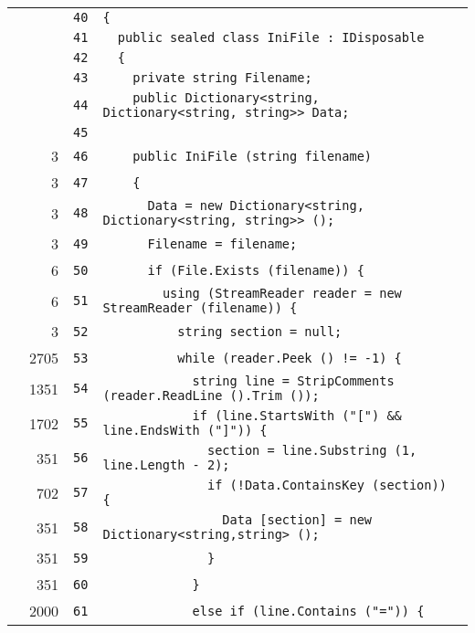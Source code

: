 \documentclass[a4paper,10pt]{article}
\begin{document}
\begin{longtable}[l]{lrrl}
\cellcolor{gray} &  & \verb~40~ & \verb~{~\\
\cellcolor{gray} &  & \verb~41~ & \verb~  public sealed class IniFile : IDisposable~\\
\cellcolor{gray} &  & \verb~42~ & \verb~  {~\\
\cellcolor{gray} &  & \verb~43~ & \verb~    private string Filename;~\\
\cellcolor{gray} &  & \verb~44~ & \verb~    public Dictionary<string, Dictionary<string, string>> Data;~\\
\cellcolor{gray} &  & \verb~45~ & \verb~~\\
\cellcolor{green} & 3 & \verb~46~ & \verb~    public IniFile (string filename)~\\
\cellcolor{green} & 3 & \verb~47~ & \verb~    {~\\
\cellcolor{green} & 3 & \verb~48~ & \verb~      Data = new Dictionary<string, Dictionary<string, string>> ();~\\
\cellcolor{green} & 3 & \verb~49~ & \verb~      Filename = filename;~\\
\cellcolor{green} & 6 & \verb~50~ & \verb~      if (File.Exists (filename)) {~\\
\cellcolor{green} & 6 & \verb~51~ & \verb~        using (StreamReader reader = new StreamReader (filename)) {~\\
\cellcolor{green} & 3 & \verb~52~ & \verb~          string section = null;~\\
\cellcolor{green} & 2705 & \verb~53~ & \verb~          while (reader.Peek () != -1) {~\\
\cellcolor{green} & 1351 & \verb~54~ & \verb~            string line = StripComments (reader.ReadLine ().Trim ());~\\
\cellcolor{green} & 1702 & \verb~55~ & \verb~            if (line.StartsWith ("[") && line.EndsWith ("]")) {~\\
\cellcolor{green} & 351 & \verb~56~ & \verb~              section = line.Substring (1, line.Length - 2);~\\
\cellcolor{green} & 702 & \verb~57~ & \verb~              if (!Data.ContainsKey (section)) {~\\
\cellcolor{green} & 351 & \verb~58~ & \verb~                Data [section] = new Dictionary<string,string> ();~\\
\cellcolor{green} & 351 & \verb~59~ & \verb~              }~\\
\cellcolor{green} & 351 & \verb~60~ & \verb~            }~\\
\cellcolor{green} & 2000 & \verb~61~ & \verb~            else if (line.Contains ("=")) {~\\

\end{longtable}
\end{document}
